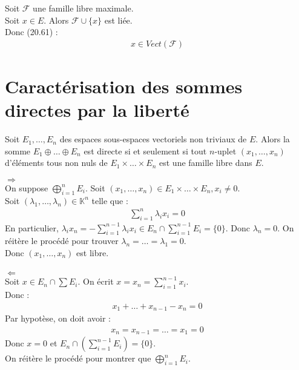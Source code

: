 \documentclass[../main.tex]{subfiles}
\begin{document}
\noindent Soit $\mathcal{F}$ une famille libre maximale. \\
Soit $x\in E$. Alors $\mathcal{F} \cup \{x\}$ est liée. \\
Donc (20.61) : 
\begin{align*}
    x \in Vect(\mathcal{F})
\end{align*}

\section{Caractérisation des sommes directes par la liberté}
\begin{tcolorbox}[title=Propostion 20.64, title filled=false, colframe=lightblue, colback=lightblue!10!white]
    Soit $E_1, \ldots, E_n$ des espaces sous-espaces vectoriels non triviaux de $E$. Alors la somme $E_1 \oplus \ldots \oplus E_n$ est directe si et seulement si tout $n$-uplet $(x_1, \ldots, x_n)$ d'éléments tous non nuls de $E_1 \times \ldots \times E_n$ est une famille libre dans $E$. 
\end{tcolorbox}

$\boxed{\Rightarrow}$ \\
On suppose $\bigoplus\limits_{i=1}^n E_i$. Soit $(x_1, \ldots, x_n) \in E_1 \times \ldots \times E_n, x_i \neq 0$. \\
Soit $(\lambda_1, \ldots, \lambda_n) \in \mathbb{K}^n$ telle que : 
\begin{align*}
    \sum_{i=1}^{n} \lambda_i x_i = 0
\end{align*}
En particulier, $\lambda_i x_n = -\sum\limits_{i=1}^{n-1} \lambda_i x_i \in E_n \cap \sum\limits_{i=1}^{n-1} E_i = \{0\}$. 
Donc $\lambda_n = 0$. On réitère le procédé pour trouver $\lambda_n = \ldots = \lambda_1 = 0$. \\
Donc $(x_1, \ldots, x_n)$ est libre. \\ \\

$\boxed{\Leftarrow}$ \\
Soit $x\in E_n \cap \sum E_i$. On écrit $x = x_n = \sum\limits_{i=1}^{n-1} x_i$. \\
Donc : 
\begin{align*}
    x_1 + \ldots + x_{n-1} - x_n = 0
\end{align*}
Par hypotèse, on doit avoir : 
\begin{align*}
    x_n = x_{n-1} = \ldots = x_1 = 0
\end{align*}
Donc $x=0$ et $E_n \cap \left( \sum\limits_{i=1}^{n-1}E_i \right) = \{0\}$. \\
On réitère le procédé pour montrer que $\bigoplus\limits_{i=1}^n E_i$.
\end{document}
